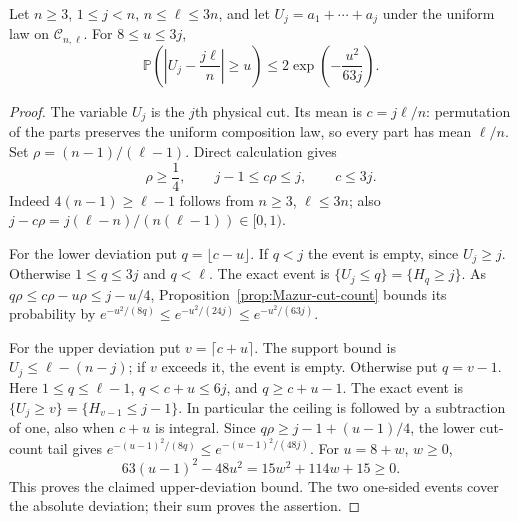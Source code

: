 \begin{proposition}
\label{prop:Mazur-order-statistic}
Let $n\ge3$, $1\le j<n$, $n\le\ell\le3n$, and let
$U_j=a_1+\cdots+a_j$ under the uniform law on $\mathcal C_{n,\ell}$.
For $8\le u\le3j$,
\begin{equation}
 \mathbb P\left(\left|U_j-\frac{j\ell}{n}\right|\ge u\right)
 \le 2\exp\left(-\frac{u^2}{63j}\right).
 \label{eq:Mazur-order-statistic}
\end{equation}
\end{proposition}
\begin{proof}
The variable $U_j$ is the $j$th physical cut. Its mean is
$c=j\ell/n$: permutation of the parts preserves the uniform
composition law, so every part has mean $\ell/n$.
Set $\rho=(n-1)/(\ell-1)$. Direct calculation gives
\[
 \rho\ge\frac14,\qquad j-1\le c\rho\le j,\qquad c\le3j.
\]
Indeed $4(n-1)\ge\ell-1$ follows from $n\ge3$, $\ell\le3n$;
also $j-c\rho=j(\ell-n)/(n(\ell-1))\in[0,1)$.

For the lower deviation put $q=\lfloor c-u\rfloor$.
If $q<j$ the event is empty, since $U_j\ge j$.
Otherwise $1\le q\le3j$ and $q<\ell$. The exact event is
$\{U_j\le q\}=\{H_q\ge j\}$.
As $q\rho\le c\rho-u\rho\le j-u/4$,
Proposition~\ref{prop:Mazur-cut-count} bounds its probability by
$e^{-u^2/(8q)}\le e^{-u^2/(24j)}\le e^{-u^2/(63j)}$.

For the upper deviation put $v=\lceil c+u\rceil$.
The support bound is $U_j\le\ell-(n-j)$; if $v$ exceeds it,
the event is empty. Otherwise put $q=v-1$.
Here $1\le q\le\ell-1$, $q<c+u\le6j$, and $q\ge c+u-1$.
The exact event is
$\{U_j\ge v\}=\{H_{v-1}\le j-1\}$.
In particular the ceiling is followed by a subtraction of one,
also when $c+u$ is integral. Since
$q\rho\ge j-1+(u-1)/4$, the lower cut-count tail gives
$e^{-(u-1)^2/(8q)}\le e^{-(u-1)^2/(48j)}$.
For $u=8+w$, $w\ge0$,
\[
 63(u-1)^2-48u^2=15w^2+114w+15\ge0.
\]
This proves the claimed upper-deviation bound.
The two one-sided events cover the absolute deviation; their sum
proves the assertion.
\end{proof}

